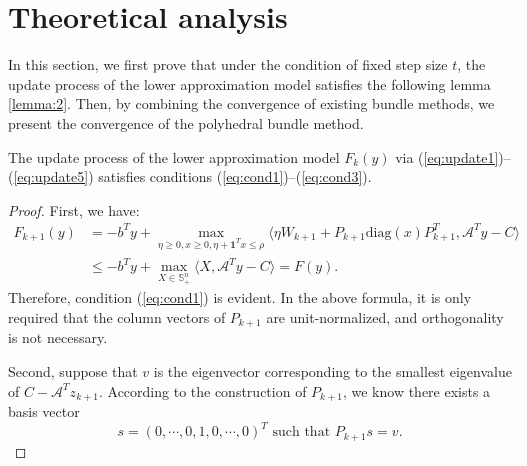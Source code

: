 \documentclass{jcmlatex}
\begin{document}
\section{Theoretical analysis}\label{sec:4} 
In this section, we first prove that under the condition of fixed step size \(t\), the update process of the lower approximation model satisfies the following lemma \ref{lemma:2}. Then, by combining the convergence of existing bundle methods, we present the convergence of the polyhedral bundle method.
\begin{lemma}\label{lemma:2}
The update process of the lower approximation model \(F_k(y)\) via (\ref{eq:update1})–(\ref{eq:update5}) satisfies conditions (\ref{eq:cond1})–(\ref{eq:cond3}).
\end{lemma}
\begin{proof}
First, we have:
\begin{equation*}
\begin{aligned}
F_{k+1}(y)&=-b^{T}y+\underset{\eta \geq 0, x \geq 0, \eta + \mathbf{1}^{T}x \leq \rho}{\max}\langle \eta W_{k+1} + P_{k+1}\text{diag}(x)P_{k+1}^{T}, \mathcal{A}^{T}y-C\rangle\\
&\leq-b^{T}y+\underset{X\in \mathbb{S}_{+}^{n}}{\max}\langle X,\mathcal{A}^{T}y-C\rangle=F(y).
\end{aligned}
\end{equation*}
Therefore, condition (\ref{eq:cond1}) is evident. In the above formula, it is only required that the column vectors of \(P_{k+1}\) are unit-normalized, and orthogonality is not necessary. 

Second, suppose that \(v\) is the eigenvector corresponding to the smallest eigenvalue of \(C-\mathcal{A}^{T}z_{k+1}\). According to the construction of \(P_{k+1}\), we know there exists a basis vector 
\begin{equation*}
s = (0,\cdots,0,1,0,\cdots,0)^{T} \text{ such that } P_{k+1}s = v.
\end{equation*}


\end{proof}
\end{document}
